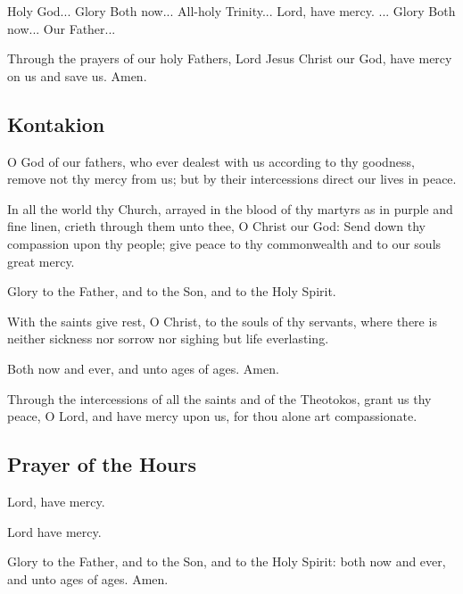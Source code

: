 Holy God... Glory  Both now... All-holy Trinity... Lord, have mercy. ... Glory  Both now... Our Father...

Through the prayers of our holy Fathers, Lord Jesus Christ our God, have mercy on us and save us. Amen.

\subsection{Kontakion}


O God of our fathers, who ever dealest with us according to thy goodness, remove not thy mercy from us; but by their intercessions direct our lives in peace.

In all the world thy Church, arrayed in the blood of thy martyrs as in purple and fine linen, crieth through them unto thee, O Christ our God: Send down thy compassion upon thy people; give peace to thy commonwealth and to our souls great mercy.

Glory to the Father, and to the Son, and to the Holy Spirit.

With the saints give rest, O Christ, to the souls of thy servants, where there is neither sickness nor sorrow nor sighing but life everlasting.

Both now and ever, and unto ages of ages. Amen.

Through the intercessions of all the saints and of the Theotokos, grant us thy peace, O Lord, and have mercy upon us, for thou alone art compassionate.


\subsection{Prayer of the Hours}

Lord, have mercy. 



Lord have mercy. 

Glory to the Father, and to the Son, and to the Holy Spirit: both now and ever, and unto ages of ages. Amen.

